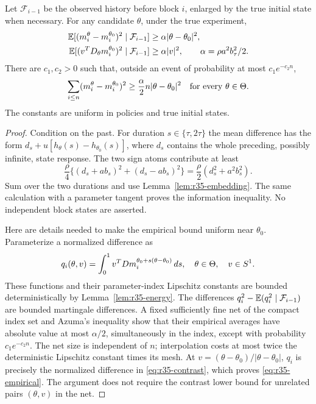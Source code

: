 \begin{lemma}\label{lem:r35-excitation}
Let $\mathcal F_{i-1}$ be the observed history before block $i$, enlarged by the true initial state when necessary. For any candidate $\theta$, under the true experiment,
\begin{align}
 \mathbb E[(m_i^\theta-m_i^{\theta_0})^2\mid\mathcal F_{i-1}]
   &\ge \alpha|\theta-\theta_0|^2,\label{eq:r35-contrast}\\
 \mathbb E[(v^TD_\theta m_i^{\theta_0})^2\mid\mathcal F_{i-1}]
   &\ge\alpha|v|^2,\qquad \alpha=\rho a^2b_\tau^2/2.\nonumber
\end{align}
There are $c_1,c_2>0$ such that, outside an event of probability at most $c_1e^{-c_2n}$,
\begin{equation}\label{eq:r35-empirical}
 \sum_{i\le n}(m_i^\theta-m_i^{\theta_0})^2
 \ge\frac\alpha2 n|\theta-\theta_0|^2\quad\hbox{for every }\theta\in\Theta.
\end{equation}
The constants are uniform in policies and true initial states.
\end{lemma}
\begin{proof}
Condition on the past. For duration $s\in\{\tau,2\tau\}$ the mean difference has the form $d_s+u[h_\theta(s)-h_{\theta_0}(s)]$, where $d_s$ contains the whole preceding, possibly infinite, state response. The two sign atoms contribute at least
\[
 \frac\rho4\{(d_s+ab_s)^2+(d_s-ab_s)^2\}
 =\frac\rho2(d_s^2+a^2b_s^2).
\]
Sum over the two durations and use Lemma~\ref{lem:r35-embedding}. The same calculation with a parameter tangent proves the information inequality. No independent block states are asserted.

Here are details needed to make the empirical bound uniform near $\theta_0$. Parameterize a normalized difference as
\[
 q_i(\theta,v)=\int_0^1v^TDm_i^{\theta_0+s(\theta-\theta_0)}\,ds,
 \quad\theta\in\Theta,\quad v\in S^1.
\]
These functions and their parameter-index Lipschitz constants are bounded deterministically by Lemma~\ref{lem:r35-energy}. The differences
$q_i^2-\mathbb E(q_i^2\mid\mathcal F_{i-1})$ are bounded martingale differences. A fixed sufficiently fine net of the compact index set and Azuma's inequality show that their empirical averages have absolute value at most $\alpha/2$, simultaneously in the index, except with probability $c_1e^{-c_2n}$. The net size is independent of $n$; interpolation costs at most twice the deterministic Lipschitz constant times its mesh. At $v=(\theta-\theta_0)/|\theta-\theta_0|$, $q_i$ is precisely the normalized difference in \eqref{eq:r35-contrast}, which proves \eqref{eq:r35-empirical}. The argument does not require the contrast lower bound for unrelated pairs $(\theta,v)$ in the net.
\end{proof}

